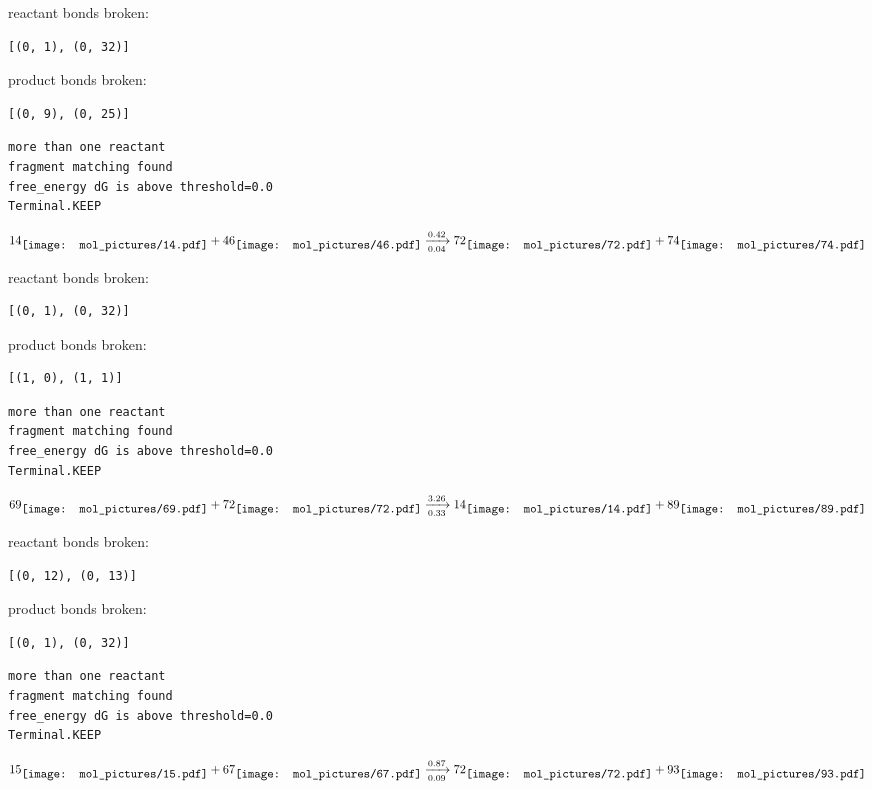 \documentclass{article}
\begin{document}
reactant bonds broken:\begin{verbatim}
[(0, 1), (0, 32)]
\end{verbatim}
product bonds broken:\begin{verbatim}
[(0, 9), (0, 25)]
\end{verbatim}




\vspace{1cm}
\begin{verbatim}
more than one reactant
fragment matching found
free_energy dG is above threshold=0.0
Terminal.KEEP
\end{verbatim}
$$
14
\raisebox{-.5\height}{\texttt{[image: mol\_pictures/14.pdf]}}
+
46
\raisebox{-.5\height}{\texttt{[image: mol\_pictures/46.pdf]}}
\xrightarrow[0.04]{0.42}
72
\raisebox{-.5\height}{\texttt{[image: mol\_pictures/72.pdf]}}
+
74
\raisebox{-.5\height}{\texttt{[image: mol\_pictures/74.pdf]}}
$$


reactant bonds broken:\begin{verbatim}
[(0, 1), (0, 32)]
\end{verbatim}
product bonds broken:\begin{verbatim}
[(1, 0), (1, 1)]
\end{verbatim}




\vspace{1cm}
\begin{verbatim}
more than one reactant
fragment matching found
free_energy dG is above threshold=0.0
Terminal.KEEP
\end{verbatim}
$$
69
\raisebox{-.5\height}{\texttt{[image: mol\_pictures/69.pdf]}}
+
72
\raisebox{-.5\height}{\texttt{[image: mol\_pictures/72.pdf]}}
\xrightarrow[0.33]{3.26}
14
\raisebox{-.5\height}{\texttt{[image: mol\_pictures/14.pdf]}}
+
89
\raisebox{-.5\height}{\texttt{[image: mol\_pictures/89.pdf]}}
$$


reactant bonds broken:\begin{verbatim}
[(0, 12), (0, 13)]
\end{verbatim}
product bonds broken:\begin{verbatim}
[(0, 1), (0, 32)]
\end{verbatim}




\vspace{1cm}
\begin{verbatim}
more than one reactant
fragment matching found
free_energy dG is above threshold=0.0
Terminal.KEEP
\end{verbatim}
$$
15
\raisebox{-.5\height}{\texttt{[image: mol\_pictures/15.pdf]}}
+
67
\raisebox{-.5\height}{\texttt{[image: mol\_pictures/67.pdf]}}
\xrightarrow[0.09]{0.87}
72
\raisebox{-.5\height}{\texttt{[image: mol\_pictures/72.pdf]}}
+
93
\raisebox{-.5\height}{\texttt{[image: mol\_pictures/93.pdf]}}
$$
\end{document}
